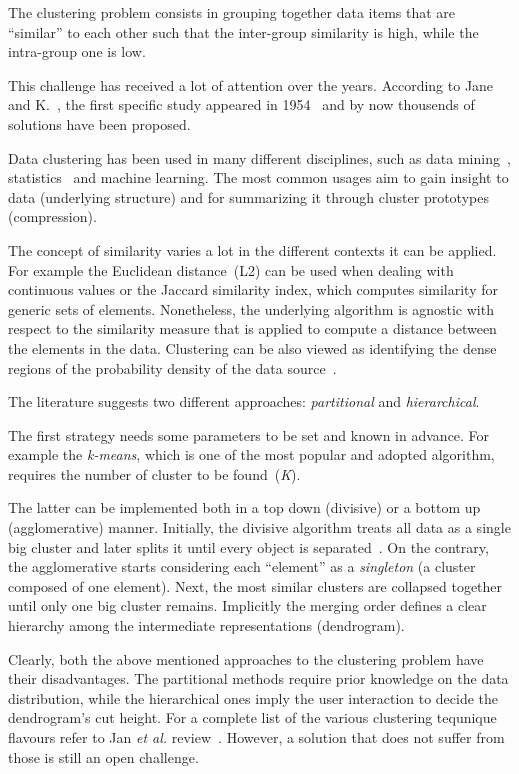 The clustering problem consists in grouping together data items that are ``similar'' to each other such that the inter-group similarity is high, while the intra-group one is low.

This challenge has received a lot of attention over the years.
According to Jane and K.~\cite{jain2010data}, the first specific study appeared in 1954~\cite{10.2307/2342679} and by now thousends of solutions have been proposed.

Data clustering has been used in many different disciplines, such as
data mining~\cite{fayyad1996advances}, statistics~\cite{tijms1994stochastic,banfield1993model} and machine learning.
The most common usages aim to gain insight to data (underlying structure) and for summarizing it through cluster prototypes (compression).

The concept of similarity varies a lot in the different contexts it can be applied.
For example the Euclidean distance~(L2) can be used when dealing with continuous values or the Jaccard similarity index, which computes similarity for generic sets of elements.
Nonetheless, the underlying algorithm is agnostic with respect to the similarity measure that is applied to compute a distance between the elements in the data.
Clustering can be also viewed as identifying the dense regions of the probability density of the data source~\cite{bradley1998scaling}.

The literature suggests two different approaches: \emph{partitional} and \emph{hierarchical}.

The first strategy needs some parameters to be set and known in advance.
For example the \emph{k-means}, which is one of the most popular and adopted algorithm,
requires the number of cluster to be found~(\emph{K}).

The latter can be implemented both in a top down (divisive) or a bottom up (agglomerative) manner.
Initially, the divisive algorithm treats all data as a single big cluster and later splits it until every object is separated~\cite{kaufman2009finding}.
On the contrary, the agglomerative starts considering each ``element'' as a \emph{singleton} (a cluster composed of one element).
Next, the most similar clusters are collapsed together until only one big cluster remains.
Implicitly the merging order defines a clear hierarchy among the intermediate representations (dendrogram).

Clearly, both the above mentioned approaches to the clustering problem have their disadvantages.
The partitional methods require prior knowledge on the data distribution, while the hierarchical ones imply the user interaction to decide the dendrogram's cut height.
For a complete list of the various clustering tequnique flavours refer to Jan \emph{et al.} review~\cite{jain2010data}.
However, a solution that does not suffer from those is still an open challenge.

